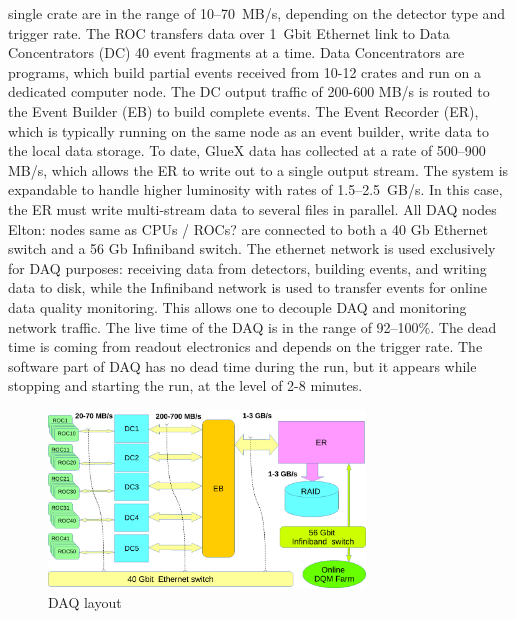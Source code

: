 single crate are in the range of 10--70~MB/s, depending on the detector type and trigger rate.
The ROC transfers data over 1~Gbit Ethernet link to Data Concentrators (DC) 40 event fragments at a time. Data Concentrators are programs, which build partial events received from 10-12 crates and run on a dedicated computer node.
The DC output traffic of 200-600 MB/s is routed to the Event Builder (EB) to build complete events.
The Event Recorder (ER), which is typically running on the same node as an event builder, write data to the local data storage.
To date, GlueX data has collected at a rate of 500--900 MB/s, which allows the ER to write out to a single output stream. The system is expandable to handle higher luminosity with rates of 1.5--2.5~GB/s. In this case, the ER must write multi-stream data to several files in parallel.
All DAQ nodes {\color{red} Elton: nodes same as CPUs / ROCs? } are connected to both a 40 Gb Ethernet switch and a 56 Gb Infiniband switch.
The ethernet network is used exclusively for DAQ purposes: receiving data from detectors, building events, and writing data to disk, 
while the Infiniband network is used to transfer events for online data quality monitoring. 
This allows one to decouple DAQ and monitoring network traffic.
The live time of the DAQ is in the range of 92--100\%. The dead time is coming from readout electronics and depends on the trigger rate.  
The software part of DAQ has no dead time during the run, but it appears while stopping and starting the run, at the level of 2-8 minutes. 



\begin{figure}[tbp]
\begin{center}
\includegraphics[width=0.75\textwidth]{figures/DAQ_coda.pdf}  
\caption{ \label{fig:CODA}
DAQ layout}

\end{center}
\end{figure}
